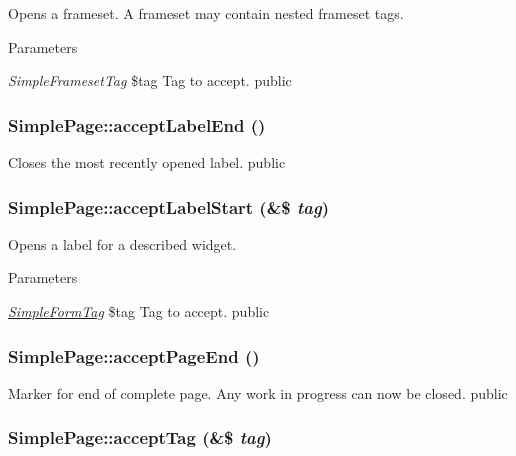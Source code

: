 \label{class_simple_page_a6ba9a670edf6f3d4416930248da0bf2b}
Opens a frameset. A frameset may contain nested frameset tags. 
\begin{DoxyParams}{Parameters}
\item[{\em SimpleFramesetTag}]\$tag Tag to accept.  public \end{DoxyParams}
\hypertarget{class_simple_page_a053ca16333751ec3d97eac827b90feb6}{
\subsubsection[{acceptLabelEnd}]{\setlength{\rightskip}{0pt plus 5cm}SimplePage::acceptLabelEnd ()}}
\label{class_simple_page_a053ca16333751ec3d97eac827b90feb6}
Closes the most recently opened label.  public \hypertarget{class_simple_page_a4058acc437ebae39d3d656c42dbc8d1a}{
\subsubsection[{acceptLabelStart}]{\setlength{\rightskip}{0pt plus 5cm}SimplePage::acceptLabelStart (\&\$ {\em tag})}}
\label{class_simple_page_a4058acc437ebae39d3d656c42dbc8d1a}
Opens a label for a described widget. 
\begin{DoxyParams}{Parameters}
\item[{\em \hyperlink{class_simple_form_tag}{SimpleFormTag}}]\$tag Tag to accept.  public \end{DoxyParams}
\hypertarget{class_simple_page_a03598dedc6655ed4b6ca6e91a04efab6}{
\subsubsection[{acceptPageEnd}]{\setlength{\rightskip}{0pt plus 5cm}SimplePage::acceptPageEnd ()}}
\label{class_simple_page_a03598dedc6655ed4b6ca6e91a04efab6}
Marker for end of complete page. Any work in progress can now be closed.  public \hypertarget{class_simple_page_a3ce47573a8bab24b30b3c49726dfb2d6}{
\subsubsection[{acceptTag}]{\setlength{\rightskip}{0pt plus 5cm}SimplePage::acceptTag (\&\$ {\em tag})}}
